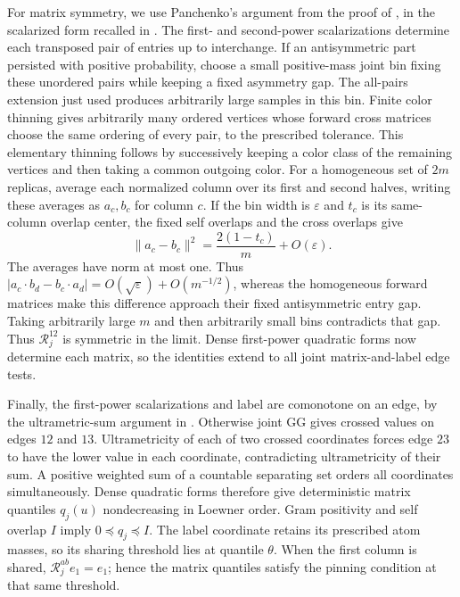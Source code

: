 \documentclass[11pt]{article}
\numberwithin{equation}{section}
\theoremstyle{definition}
\begin{document}
For matrix symmetry, we use Panchenko's argument from the proof of \cite[Theorem~3]{PanPotts}, in the scalarized form recalled in \cite[proof of Proposition~5.2]{Mourrat2023}. The first- and second-power scalarizations determine each transposed pair of entries up to interchange. If an antisymmetric part persisted with positive probability, choose a small positive-mass joint bin fixing these unordered pairs while keeping a fixed asymmetry gap. The all-pairs extension just used produces arbitrarily large samples in this bin. Finite color thinning gives arbitrarily many ordered vertices whose forward cross matrices choose the same ordering of every pair, to the prescribed tolerance. This elementary thinning follows by successively keeping a color class of the remaining vertices and then taking a common outgoing color. For a homogeneous set of $2m$ replicas, average each normalized column over its first and second halves, writing these averages as $a_c,b_c$ for column $c$. If the bin width is $\varepsilon$ and $t_c$ is its same-column overlap center, the fixed self overlaps and the cross overlaps give
\[
\|a_c-b_c\|^2=\frac{2(1-t_c)}m+O(\varepsilon).
\]
The averages have norm at most one. Thus
$|a_c\cdot b_d-b_c\cdot a_d|=O(\sqrt\varepsilon)+O(m^{-1/2})$,
whereas the homogeneous forward matrices make this difference approach their fixed antisymmetric entry gap. Taking arbitrarily large $m$ and then arbitrarily small bins contradicts that gap. Thus $\mathcal R_j^{12}$ is symmetric in the limit. Dense first-power quadratic forms now determine each matrix, so the identities extend to all joint matrix-and-label edge tests.

Finally, the first-power scalarizations and label are comonotone on an edge, by the ultrametric-sum argument in \cite[proof of Theorem~5.3, Step~3]{Mourrat2021}. Otherwise joint GG gives crossed values on edges $12$ and $13$. Ultrametricity of each of two crossed coordinates forces edge $23$ to have the lower value in each coordinate, contradicting ultrametricity of their sum. A positive weighted sum of a countable separating set orders all coordinates simultaneously. Dense quadratic forms therefore give deterministic matrix quantiles $q_j(u)$ nondecreasing in Loewner order. Gram positivity and self overlap $I$ imply $0\preceq q_j\preceq I$. The label coordinate retains its prescribed atom masses, so its sharing threshold lies at quantile $\theta$. When the first column is shared, $\mathcal R_j^{ab}e_1=e_1$; hence the matrix quantiles satisfy the pinning condition at that same threshold.
\end{document}
